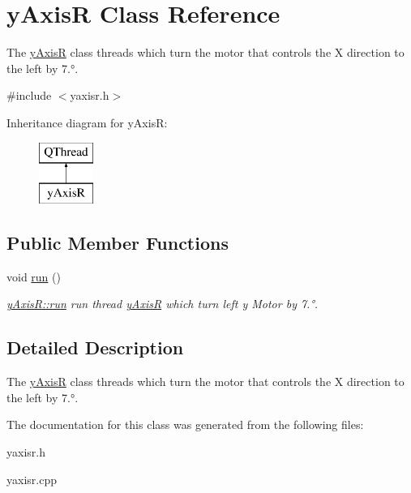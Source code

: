 \hypertarget{classy_axis_r}{}\section{y\+AxisR Class Reference}
\label{classy_axis_r}


The \mbox{\hyperlink{classy_axis_r}{y\+AxisR}} class threads which turn the motor that controls the X direction to the left by 7.°.  




{\ttfamily \#include $<$yaxisr.\+h$>$}

Inheritance diagram for y\+AxisR\+:\begin{figure}[H]
\begin{center}
\leavevmode
\includegraphics[height=2.000000cm]{classy_axis_r}
\end{center}
\end{figure}
\subsection*{Public Member Functions}
\begin{DoxyCompactItemize}
\item 
\mbox{\label{classy_axis_r_ae1b36864afc6373e911b75e0878b5677}} 
void \mbox{\hyperlink{classy_axis_r_ae1b36864afc6373e911b75e0878b5677}{run}} ()
\begin{DoxyCompactList}\small\item\em \mbox{\hyperlink{classy_axis_r_ae1b36864afc6373e911b75e0878b5677}{y\+Axis\+R\+::run}} run thread \mbox{\hyperlink{classy_axis_r}{y\+AxisR}} which turn left y Motor by 7.°. \end{DoxyCompactList}\end{DoxyCompactItemize}


\subsection{Detailed Description}
The \mbox{\hyperlink{classy_axis_r}{y\+AxisR}} class threads which turn the motor that controls the X direction to the left by 7.°. 

The documentation for this class was generated from the following files\+:\begin{DoxyCompactItemize}
\item 
yaxisr.\+h\item 
yaxisr.\+cpp\end{DoxyCompactItemize}
